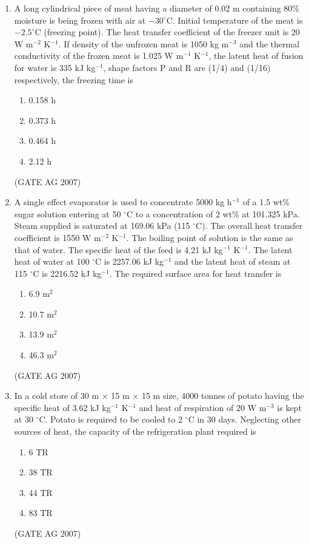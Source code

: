 \documentclass[journal,12pt,onecolumn]{IEEEtran}
\theoremstyle{remark}
\begin{document}
\begin{enumerate}
\item A long cylindrical piece of meat having a diameter of 0.02 m containing 80\% moisture is being frozen with air at $-30^{\circ}$C. Initial temperature of the meat is $-2.5^{\circ}$C (freezing point). The heat transfer coefficient of the freezer unit is 20 W m$^{-2}$ K$^{-1}$. If density of the unfrozen meat is 1050 kg m$^{-3}$ and the thermal conductivity of the frozen meat is 1.025 W m$^{-1}$ K$^{-1}$, the latent heat of fusion for water is 335 kJ kg$^{-1}$, shape factors P and R are (1/4) and (1/16) respectively, the freezing time is
\begin{multicols}{4}
\begin{enumerate}
    \item 0.158 h
    \item 0.373 h
    \item 0.464 h
    \item 2.12 h
\end{enumerate}
\end{multicols}
\hfill(GATE AG 2007)

\item A single effect evaporator is used to concentrate 5000 kg h$^{-1}$ of a 1.5 wt\% sugar solution entering at 50 $^{\circ}$C to a concentration of 2 wt\% at 101.325 kPa. Steam supplied is saturated at 169.06 kPa (115 $^{\circ}$C). The overall heat transfer coefficient is 1550 W m$^{-2}$ K$^{-1}$. The boiling point of solution is the same as that of water. The specific heat of the feed is 4.21 kJ kg$^{-1}$ K$^{-1}$. The latent heat of water at 100 $^{\circ}$C is 2257.06 kJ kg$^{-1}$ and the latent heat of steam at 115 $^{\circ}$C is 2216.52 kJ kg$^{-1}$. The required surface area for heat transfer is
\begin{multicols}{4}
\begin{enumerate}
    \item 6.9 m$^{2}$
    \item 10.7 m$^{2}$
    \item 13.9 m$^{2}$
    \item 46.3 m$^{2}$
\end{enumerate}
\end{multicols}
\hfill(GATE AG 2007)

\item In a cold store of 30 m $\times$ 15 m $\times$ 15 m size, 4000 tonnes of potato having the specific heat of 3.62 kJ kg$^{-1}$ K$^{-1}$ and heat of respiration of 20 W m$^{-3}$ is kept at 30 $^{\circ}$C. Potato is required to be cooled to 2 $^{\circ}$C in 30 days. Neglecting other sources of heat, the capacity of the refrigeration plant required is
\begin{multicols}{4}
\begin{enumerate}
    \item 6 TR
    \item 38 TR
    \item 44 TR
    \item 83 TR
\end{enumerate}
\end{multicols}
\hfill(GATE AG 2007)


\end{enumerate}
\end{document}
